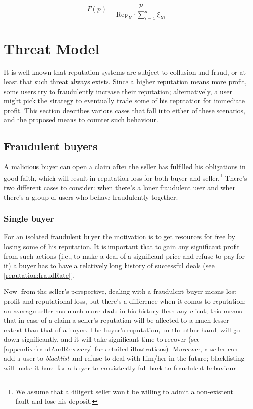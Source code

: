 \documentclass[11pt]{article}
\begin{document}
\begin{equation} \label{reputationFunction}
F(p) = \frac{p}{\text{Rep}_X \cdot \sum_{i=1}^{n}\xi_{Xi}}
\end{equation}

\section{Threat Model} \label{threatModel}

It is well known \cite{ciccarelli2011collusion, maranzato2010fraud} that reputation systems are subject to collusion and fraud, or at least that such threat always exists. Since a higher reputation means more profit, some users try to fraudulently increase their reputation; alternatively, a user might 
pick the strategy to eventually trade some of his reputation for immediate profit. This section describes various cases that fall into either of these scenarios, and the proposed means to counter such behaviour.

\subsection{Fraudulent buyers} \label{threatModel:buyers}

A malicious buyer can open a claim after the seller has fulfilled his obligations in good faith, which will result in reputation loss for both buyer and seller.\footnote{We assume that a diligent seller won't be willing to admit a non-existent fault and lose his deposit.} There's two different cases to consider: when there's a loner fraudulent user and when there's a group of users who behave fraudulently together.

\subsubsection{Single buyer} \label{threatModel:buyers:single}

For an isolated fraudulent buyer the motivation is to get resources for free by losing some of his reputation. It is important that to gain any significant profit from such actions (i.e., to make a deal of a significant price and refuse to pay for it) a buyer has to have a relatively long history of successful deals (see \ref{reputation:fraudRate}).


Now, from the seller's perspective, dealing with a fraudulent buyer means lost profit and reputational loss, but there's a difference when it comes to reputation: an average seller has much more deals in his history than any client; this means that in case of a claim a seller's reputation will be affected to a much lesser extent than that of a buyer. The buyer's reputation, on the other hand, will go down significantly, and it will take significant time to recover (see \ref{appendix:fraudAndRecovery} for detailed illustrations). Moreover, a seller can add a user to \textit{blacklist} and refuse to deal with him/her in the future; blacklisting will make it hard for a buyer to consistently fall back to fraudulent behaviour. 
\end{document}
